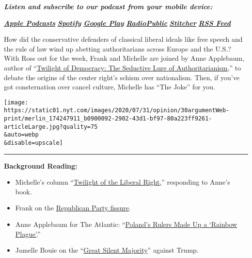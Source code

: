 \emph{\textbf{Listen and subscribe to our podcast from your mobile
device:}}

\textbf{\href{https://itunes.apple.com/us/podcast/the-argument/id1438024613?mt=2}{\emph{Apple
Podcasts}}} \emph{\textbf{\textbar{}}}
\textbf{\href{https://open.spotify.com/show/6bmhSFLKtApYClEuSH8q42}{\emph{Spotify}}}
\emph{\textbf{\textbar{}}}
\textbf{\href{https://play.google.com/music/m/Idxib4hsg3yviao4gtym76knjjy?t=The_Argument}{\emph{Google
Play}}} \emph{\textbf{\textbar{}}}
\textbf{\href{https://radiopublic.com/the-argument-Wdbepr}{\emph{RadioPublic}}}
\emph{\textbf{\textbar{}}}
\textbf{\href{https://www.stitcher.com/podcast/the-new-york-times/the-argument}{\emph{Stitcher}}}
\emph{\textbf{\textbar{}}}
\textbf{\href{https://rss.art19.com/the-argument}{\emph{RSS Feed}}}

How did the conservative defenders of classical liberal ideals like free
speech and the rule of law wind up abetting authoritarians across Europe
and the U.S.? With Ross out for the week, Frank and Michelle are joined
by Anne Applebaum, author of
``\href{https://www.penguinrandomhouse.com/books/621076/twilight-of-democracy-by-anne-applebaum/}{Twilight
of Democracy: The Seductive Lure of Authoritarianism},'' to debate the
origins of the center right's schism over nationalism. Then, if you've
got consternation over cancel culture, Michelle has ``The Joke'' for
you.

\texttt{[image: https://static01.nyt.com/images/2020/07/31/opinion/30argumentWeb-print/merlin\_174247911\_b0900092-2902-43d1-bf97-80a223ff9261-articleLarge.jpg?quality=75\\\&auto=webp\\\&disable=upscale]}

\begin{center}\rule{0.5\linewidth}{\linethickness}\end{center}

\textbf{Background Reading:}

\begin{itemize}
\item
  Michelle's column
  ``\href{https://www.nytimes.com/2020/07/27/opinion/anne-applebaum-twilight-of-democracy.html}{Twilight
  of the Liberal Right,}'' responding to Anne's book.
\item
  Frank on the
  \href{https://www.nytimes.com/2020/07/11/opinion/sunday/republican-party-trump-2020.html}{Republican
  Party fissure}.
\item
  Anne Applebaum for The Atlantic:
  ``\href{https://www.theatlantic.com/ideas/archive/2020/07/polands-rulers-manufactured-a-rainbow-plague/614113/}{Poland's
  Rulers Made Up a `Rainbow Plague'}.''
\item
  Jamelle Bouie on the
  ``\href{https://www.nytimes.com/2020/07/24/opinion/trump-silent-majority.html}{Great
  Silent Majority}'' against Trump.
\end{itemize}

